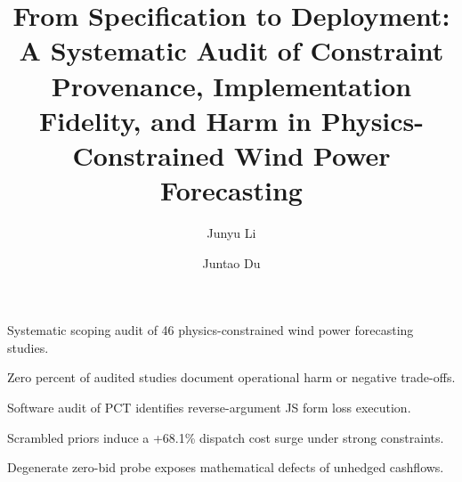 \documentclass[3p,twocolumn,times]{elsarticle}
\theoremstyle{definition}
\theoremstyle{remark}
\begin{document}
\begin{frontmatter}

\title{From Specification to Deployment: A Systematic Audit of Constraint Provenance, Implementation Fidelity, and Harm in Physics-Constrained Wind Power Forecasting}

\author[1]{Junyu Li}
\author[1]{Juntao Du}

\address[1]{School of Statistics and Applied Mathematics, Anhui University of Finance and Economics, Bengbu 233030, China}


\begin{highlights}
\item Systematic scoping audit of 46 physics-constrained wind power forecasting studies.
\item Zero percent of audited studies document operational harm or negative trade-offs.
\item Software audit of PCT identifies reverse-argument JS form loss execution.
\item Scrambled priors induce a +68.1\% dispatch cost surge under strong constraints.
\item Degenerate zero-bid probe exposes mathematical defects of unhedged cashflows.
\end{highlights}


\end{frontmatter}
\end{document}
